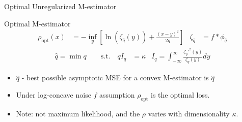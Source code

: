 \documentclass[pdf]{beamer}
\begin{document}
\begin{frame}[t]{Optimal Unregularized M-estimator}



    \vspace{.2in}

    \begin{block}{Optimal M-estimator}
        \begin{align*}
            \rho_{\text{opt}}(x) &= -\inf_y{\left[\ln(\zeta_{\hat{q}}(y))+\frac{(x-y)^2}{2 \hat{q}}\right]} & \zeta_{\hat{q}} &= f*\phi_{\hat{q}}
        \end{align*}
        \begin{align*}
           \hat{q} = \min{q} \quad \quad \text{s.t.} \quad q I_{q} &=\kappa & I_{q} = \int_{-\infty}^{\infty}{\frac{\zeta_{q}'^2(y)}{\zeta_{q}(y)}dy}
        \end{align*}


        \begin{itemize}
        \vspace{.1in}
        \item $\hat{q}$ - best possible asymptotic MSE for a convex M-estimator is $\hat{q}$

        \item Under log-concave noise $f$ assumption $\rho_{\text{opt}}$ is the optimal loss.

        \item{Note: not maximum likelihood, and the $\rho$ varies with dimensionality $\kappa$.}
        \end{itemize}

    \end{block}

\end{frame}
\end{document}
